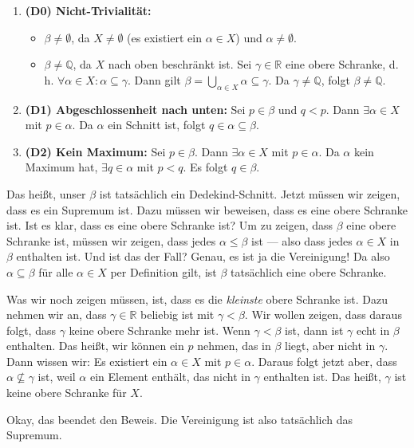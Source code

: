 \begin{math-stroke}
\begin{enumerate}[label=\textbf{(D\arabic*)}, start=0]
    \item \textbf{(D0) Nicht-Trivialität:} 
    \begin{itemize}
        \item $\beta \neq \emptyset$, da $X \neq \emptyset$ (es existiert ein $\alpha \in X$) und $\alpha \neq \emptyset$.
        \item $\beta \neq \mathbb{Q}$, da $X$ nach oben beschränkt ist. Sei $\gamma \in \mathbb{R}$ eine obere Schranke, d.\,h. $\forall \alpha \in X \colon \alpha \subseteq \gamma$. Dann gilt $\beta = \bigcup_{\alpha \in X} \alpha \subseteq \gamma$. Da $\gamma \neq \mathbb{Q}$, folgt $\beta \neq \mathbb{Q}$.
    \end{itemize}
    \item \textbf{(D1) Abgeschlossenheit nach unten:} Sei $p \in \beta$ und $q < p$. Dann $\exists \alpha \in X$ mit $p \in \alpha$. Da $\alpha$ ein Schnitt ist, folgt $q \in \alpha \subseteq \beta$.
    \item \textbf{(D2) Kein Maximum:} Sei $p \in \beta$. Dann $\exists \alpha \in X$ mit $p \in \alpha$. Da $\alpha$ kein Maximum hat, $\exists q \in \alpha$ mit $p < q$. Es folgt $q \in \beta$.
\end{enumerate}
\end{math-stroke}

\begin{spoken-clean}[01:18:15 - 01:21:00]
Das heißt, unser $\beta$ ist tatsächlich ein Dedekind-Schnitt. Jetzt müssen wir zeigen, dass es ein Supremum ist. Dazu müssen wir beweisen, dass es eine obere Schranke ist. Ist es klar, dass es eine obere Schranke ist? Um zu zeigen, dass $\beta$ eine obere Schranke ist, müssen wir zeigen, dass jedes $\alpha \le \beta$ ist --- also dass jedes $\alpha \in X$ in $\beta$ enthalten ist. Und ist das der Fall? Genau, es ist ja die Vereinigung! Da also $\alpha \subseteq \beta$ für alle $\alpha \in X$ per Definition gilt, ist $\beta$ tatsächlich eine obere Schranke.

Was wir noch zeigen müssen, ist, dass es die \emph{kleinste} obere Schranke ist. Dazu nehmen wir an, dass $\gamma \in \mathbb{R}$ beliebig ist mit $\gamma < \beta$. Wir wollen zeigen, dass daraus folgt, dass $\gamma$ keine obere Schranke mehr ist. Wenn $\gamma < \beta$ ist, dann ist $\gamma$ echt in $\beta$ enthalten. Das heißt, wir können ein $p$ nehmen, das in $\beta$ liegt, aber nicht in $\gamma$. Dann wissen wir: Es existiert ein $\alpha \in X$ mit $p \in \alpha$. Daraus folgt jetzt aber, dass $\alpha \not\subseteq \gamma$ ist, weil $\alpha$ ein Element enthält, das nicht in $\gamma$ enthalten ist. Das heißt, $\gamma$ ist keine obere Schranke für $X$.

Okay, das beendet den Beweis. Die Vereinigung ist also tatsächlich das Supremum.
\end{spoken-clean}

